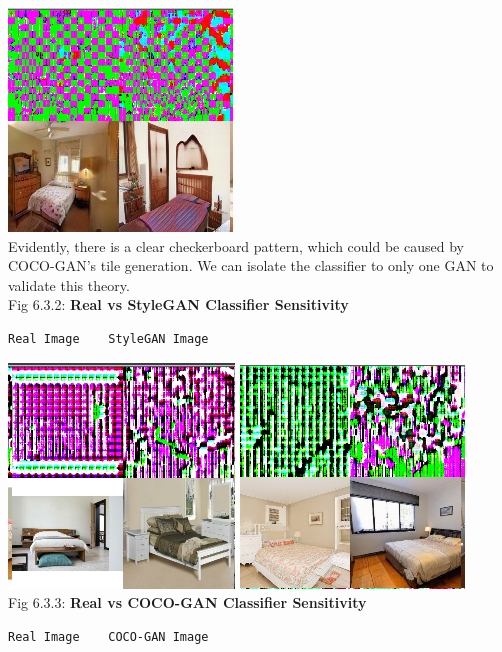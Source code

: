 \documentclass[10pt]{article}
\begin{document}
\begin{multicols*}{2}
        \includegraphics[scale=0.3]{smoothgrad/combined/coco.png}\\
        Evidently, there is a clear checkerboard pattern, which could be caused by COCO-GAN's tile generation.
        We can isolate the classifier to only one GAN to validate this theory.\\
        Fig 6.3.2: \textbf{Real vs StyleGAN Classifier Sensitivity}
        \begin{verbatim}Real Image    StyleGAN Image\end{verbatim}
        \includegraphics[scale=0.3]{smoothgrad/stylegan/real.png}
        \includegraphics[scale=0.3]{smoothgrad/stylegan/stylegan.png}\\
        Fig 6.3.3: \textbf{Real vs COCO-GAN Classifier Sensitivity}
        \begin{verbatim}Real Image    COCO-GAN Image\end{verbatim}

\end{multicols*}
\end{document}
